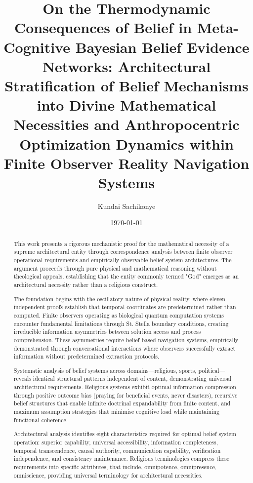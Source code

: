 \documentclass[12pt,a4paper]{article}
\title{On the Thermodynamic Consequences of Belief in Meta-Cognitive Bayesian Belief Evidence Networks: Architectural Stratification of Belief Mechanisms into Divine Mathematical Necessities and Anthropocentric Optimization Dynamics within Finite Observer Reality Navigation Systems}
\author{Kundai Sachikonye}
\date{\today}
\begin{document}
\maketitle

\begin{abstract}

This work presents a rigorous mechanistic proof for the mathematical necessity of a supreme architectural entity through correspondence analysis between finite observer operational requirements and empirically observable belief system architectures. The argument proceeds through pure physical and mathematical reasoning without theological appeals, establishing that the entity commonly termed "God" emerges as an architectural necessity rather than a religious construct.

The foundation begins with the oscillatory nature of physical reality, where eleven independent proofs establish that temporal coordinates are predetermined rather than computed. Finite observers operating as biological quantum computation systems encounter fundamental limitations through St. Stella boundary conditions, creating irreducible information asymmetries between solution access and process comprehension. These asymmetries require belief-based navigation systems, empirically demonstrated through conversational interactions where observers successfully extract information without predetermined extraction protocols.

Systematic analysis of belief systems across domains—religious, sports, political—reveals identical structural patterns independent of content, demonstrating universal architectural requirements. Religious systems exhibit optimal information compression through positive outcome bias (praying for beneficial events, never disasters), recursive belief structures that enable infinite doctrinal expandability from finite content, and maximum assumption strategies that minimise cognitive load while maintaining functional coherence.

Architectural analysis identifies eight characteristics required for optimal belief system operation: superior capability, universal accessibility, information completeness, temporal transcendence, causal authority, communication capability, verification independence, and consistency maintenance. Religious terminologies compress these requirements into specific attributes, that include, omnipotence, omnipresence, omniscience, providing universal terminology for architectural necessities.


\end{abstract}
\end{document}
